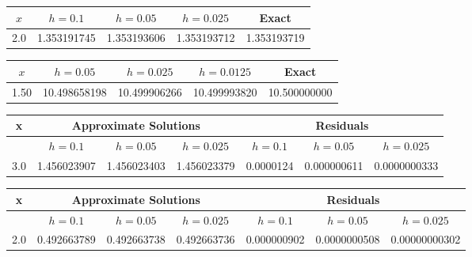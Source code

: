 {\small
{}
\begin{tabular}{|c|r|r|r|r|}\hline
\multicolumn{1}{|c|}{$x$}&
\multicolumn{1}{|c|}{$h=0.1$}&
\multicolumn{1}{|c|}{$h=0.05$}&
\multicolumn{1}{|c|}{$h=0.025$}&
\multicolumn{1}{|c|}{Exact}\\ \hline
2.0 & 1.353191745 & 1.353193606 & 1.353193712 & 1.353193719\\
\hline
\end{tabular}}\bigskip

{\small
{}
\begin{tabular}{|c|r|r|r|r|}\hline
\multicolumn{1}{|c|}{$x$}&
\multicolumn{1}{|c|}{$h=0.05$}&
\multicolumn{1}{|c|}{$h=0.025$}&
\multicolumn{1}{|c|}{$h=0.0125$}&
\multicolumn{1}{|c|}{Exact}\\ \hline
1.50 & 10.498658198 & 10.499906266 & 10.499993820 & 10.500000000 \\
\hline
\end{tabular}}\bigskip

{\small
{}
\begin{tabular}{|c|r|r|r|r|r|r|}\hline
x&\multicolumn{3}{c|}{Approximate Solutions}&
\multicolumn{3}{c|}{Residuals}\\\hline
&\multicolumn{1}{|c|}{$h=0.1$}&
\multicolumn{1}{|c|}{$h=0.05$}&
\multicolumn{1}{|c|}{$h=0.025$}&
\multicolumn{1}{|c|}{$h=0.1$}&
\multicolumn{1}{|c|}{$h=0.05$}&
\multicolumn{1}{|c|}{$h=0.025$}\\ \hline
3.0 & 1.456023907 & 1.456023403 & 1.456023379 & 0.0000124 & 0.000000611 & 0.0000000333  \\
\hline
\end{tabular}}\bigskip

{\small
{}
\begin{tabular}{|c|r|r|r|r|r|r|}\hline
x&\multicolumn{3}{c|}{Approximate Solutions}&
\multicolumn{3}{c|}{Residuals}\\\hline
&\multicolumn{1}{|c|}{$h=0.1$}&
\multicolumn{1}{|c|}{$h=0.05$}&
\multicolumn{1}{|c|}{$h=0.025$}&
\multicolumn{1}{|c|}{$h=0.1$}&
\multicolumn{1}{|c|}{$h=0.05$}&
\multicolumn{1}{|c|}{$h=0.025$}\\ \hline
2.0 & 0.492663789 & 0.492663738 & 0.492663736 & 0.000000902 &  0.0000000508 &   0.00000000302 \\
\hline
\end{tabular}}\bigskip


